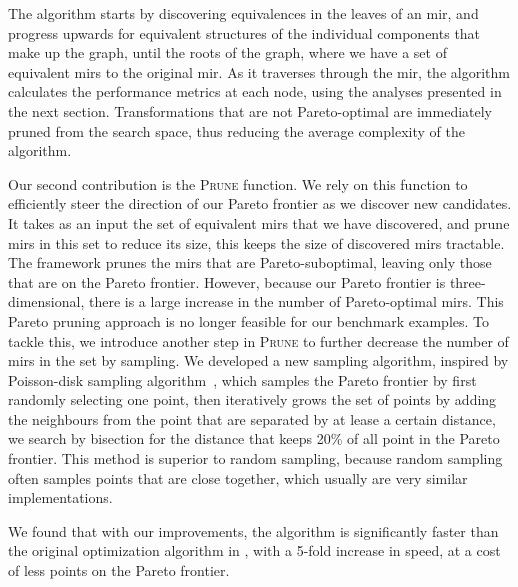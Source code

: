 The algorithm starts by discovering equivalences in the leaves of an \gls{mir},
and progress upwards for equivalent structures of the individual components
that make up the graph, until the roots of the graph, where we have a set of
equivalent \glspl{mir} to the original \gls{mir}\@.  As it traverses through
the \gls{mir}, the algorithm calculates the performance metrics at each node,
using the analyses presented in the next section.  Transformations that are not
Pareto-optimal are immediately pruned from the search space, thus reducing the
average complexity of the algorithm.

Our second contribution is the \textsc{Prune} function.  We rely on this
function to efficiently steer the direction of our Pareto frontier as
we discover new candidates.  It takes as an input the set of equivalent
\glspl{mir} that we have discovered, and prune \glspl{mir} in this set to
reduce its size, this keeps the size of discovered \glspl{mir} tractable.  The
\soap{} framework prunes the \glspl{mir} that are Pareto-suboptimal, leaving
only those that are on the Pareto frontier.  However, because our Pareto
frontier is three-dimensional, there is a large increase in the number of
Pareto-optimal \glspl{mir}.  This Pareto pruning approach is no longer feasible
for our benchmark examples.  To tackle this, we introduce another step in
\textsc{Prune} to further decrease the number of \glspl{mir} in the set by
sampling.  We developed a new sampling algorithm, inspired by Poisson-disk
sampling algorithm~\cite{bridson07}, which samples the Pareto frontier by first
randomly selecting one point, then iteratively grows the set of points by
adding the neighbours from the point that are separated by at lease a certain
distance, we search by bisection for the distance that keeps 20\% of all point
in the Pareto frontier.  This method is superior to random sampling, because
random sampling often samples points that are close together, which usually are
very similar implementations.

We found that with our improvements, the algorithm is significantly faster than
the original optimization algorithm in \soap, with a 5-fold increase in speed,
at a cost of less points on the Pareto frontier.

